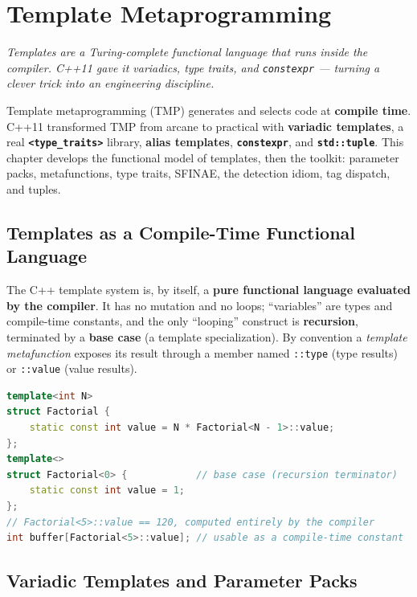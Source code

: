 \chapter{Template Metaprogramming}
\label{ch:template-metaprogramming}

\textit{Templates are a Turing-complete functional language that runs inside the compiler. C++11 gave it variadics, type traits, and \texttt{constexpr} --- turning a clever trick into an engineering discipline.}

Template metaprogramming (TMP) generates and selects code at \textbf{compile time}. C++11 transformed TMP from arcane to practical with \textbf{variadic templates}, a real \textbf{\texttt{<type\_traits>}} library, \textbf{alias templates}, \textbf{\texttt{constexpr}}, and \textbf{\texttt{std::tuple}}. This chapter develops the functional model of templates, then the toolkit: parameter packs, metafunctions, type traits, SFINAE, the detection idiom, tag dispatch, and tuples.

\section{Templates as a Compile-Time Functional Language}

The C++ template system is, by itself, a \textbf{pure functional language evaluated by the compiler}. It has no mutation and no loops; ``variables'' are types and compile-time constants, and the only ``looping'' construct is \textbf{recursion}, terminated by a \textbf{base case} (a template specialization). By convention a \emph{template metafunction} exposes its result through a member named \texttt{::type} (type results) or \texttt{::value} (value results).

\begin{lstlisting}[language=C++, caption={a metafunction computing a value at compile time}]
template<int N>
struct Factorial {
    static const int value = N * Factorial<N - 1>::value;
};
template<>
struct Factorial<0> {            // base case (recursion terminator)
    static const int value = 1;
};
// Factorial<5>::value == 120, computed entirely by the compiler
int buffer[Factorial<5>::value]; // usable as a compile-time constant
\end{lstlisting}

\section{Variadic Templates and Parameter Packs}

